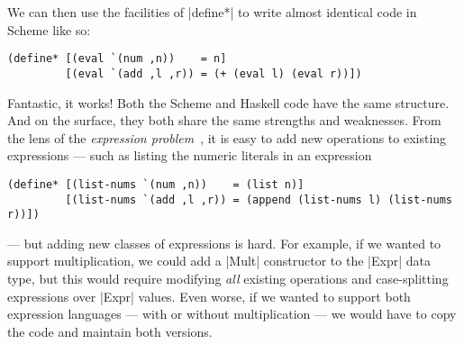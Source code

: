 We can then use the facilities of \scm|define*| to write almost identical code in Scheme like so:
\begin{verbatim}
(define* [(eval `(num ,n))    = n]
         [(eval `(add ,l ,r)) = (+ (eval l) (eval r))])
\end{verbatim}
Fantastic, it works!
Both the Scheme and Haskell code have the same structure.
And on the surface, they both share the same strengths and weaknesses.
From the lens of the \emph{expression problem}~\cite{ExpressionProblem}, it is easy to add new operations to existing expressions --- such as listing the numeric literals in an expression
\begin{verbatim}
(define* [(list-nums `(num ,n))    = (list n)]
         [(list-nums `(add ,l ,r)) = (append (list-nums l) (list-nums r))])
\end{verbatim}
--- but adding new classes of expressions is hard.
For example, if we wanted to support multiplication, we could add a \hs|Mult| constructor to the \hs|Expr| data type, but this would require modifying \emph{all} existing operations and case-splitting expressions over \hs|Expr| values.
Even worse, if we wanted to support both expression languages --- with or without multiplication --- we would have to copy the code and maintain both versions.


